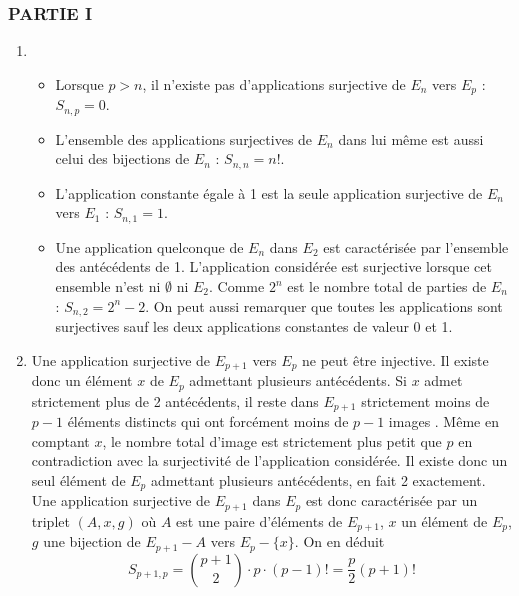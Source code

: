 
\subsubsection*{PARTIE I}

\begin{enumerate}
\item
\begin{itemize}
\item  Lorsque $p>n$, il n'existe pas d'applications surjective de $E_{n}$
vers $E_{p}$ : $S_{n,p}=0$.

\item  L'ensemble des applications surjectives de $E_{n}$ dans lui m{\^e}me
est aussi celui des bijections de $E_{n}$ : $S_{n,n}=n!$.

\item  L'application constante {\'e}gale {\`a} 1 est la seule application
surjective de $E_{n}$ vers $E_{1}$ : $S_{n,1}=1$.

\item  Une application quelconque de $E_{n}$ dans $E_{2}$ est
caract{\'e}ris{\'e}e par l'ensemble des ant{\'e}c{\'e}dents de 1. L'application
consid{\'e}r{\'e}e est surjective lorsque cet ensemble n'est
ni $\emptyset $ ni $E_{2}$. Comme $2^{n}$ est le nombre total de parties de $E_{n}$ : $S_{n,2}=2^{n}-2$. On peut aussi remarquer que toutes les applications sont surjectives sauf les deux applications constantes de valeur 0 et 1.
\end{itemize}

\item  Une application surjective de $E_{p+1}$ vers $E_{p}$ ne peut {\^e}tre
injective. Il existe donc un {\'e}l{\'e}ment $x$ de $E_{p}$ admettant
plusieurs ant{\'e}c{\'e}dents. Si $x$ admet strictement plus de 2
ant{\'e}c{\'e}dents, il reste dans $E_{p+1}$ strictement moins de $p-1$
{\'e}l{\'e}ments distincts qui ont forc{\'e}ment moins de $p-1$ images . M{\^e}me
en comptant $x$, le nombre total d'image est strictement plus
petit que $p$ en contradiction avec la surjectivit{\'e} de
l'application consid{\'e}r{\'e}e. Il existe donc un seul {\'e}l{\'e}ment de
$E_{p}$ admettant plusieurs ant{\'e}c{\'e}dents, en fait 2
exactement.\newline
 Une application surjective de $E_{p+1}$ dans
$E_{p}$ est donc caract{\'e}ris{\'e}e par un triplet $(A,x,g)$ o{\`u} $A$ est
une paire d'{\'e}l{\'e}ments de $E_{p+1}$, $x$ un {\'e}l{\'e}ment de $E_{p}$, $g$
une bijection de $E_{p+1}-A$ vers $E_{p}-\{x\}$. On en d{\'e}duit
\[
S_{p+1,p}=\binom{p+1}{2}\cdot p\cdot (p-1)!=\frac{p}{2}(p+1)!
\]
\end{enumerate}

